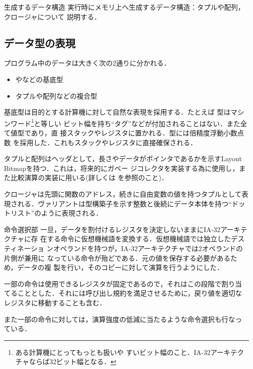 \documentclass[a4paper,titlepage,report,disablejfam]{jsbook}
\begin{document}
\begin{resbonsiblesection}{生成するデータ構造}{\kobori}\label{sc:impl-data-structure}%
 実行時にメモリ上へ生成するデータ構造：タプルや配列，クロージャについて
 説明する．

\subsection{データ型の表現}
プログラム中のデータは大きく次の2通りに分かれる．
\begin{itemize}
 \item {}やなどの基底型
 \item タプルや配列などの複合型
\end{itemize}

基底型は目的とする計算機に対して自然な表現を採用する．たとえば
型はマシンワード\footnote{ある計算機にとってもっとも扱いや
すいビット幅のこと．IA-32アーキテクチャならば32ビット幅となる．}と等しい
ビット幅を持ち``タグ''などが付加されることはない．また全て値型であり，直
接スタックやレジスタに置かれる．型には倍精度浮動小数点数
を採用した．これもスタックやレジスタに直接確保される．

タプルと配列はヘッダとして，長さやデータがポインタであるかを示すLayout
Bitmap\cite{Nguyen:2006:CMP:1140335.1140364}を持つ．これは，将来的にガベー
ジコレクタを実装する為に使用し，また比較演算の実装に用いる(詳しくは
を参照のこと)．

クロージャは先頭に関数のアドレス，続きに自由変数の値を持つタプルとして表
現される．ヴァリアントは型構築子を示す整数と後続にデータ本体を持つ``ドッ
トリスト''のように表現される．
\end{resbonsiblesection}

\begin{resbonsiblesection}{命令選択部}{\kobori}\label{sc:impl-inst}
 一旦，データを割付けるレジスタを決定しないままにIA-32アーキテクチャに存
 在する命令に仮想機械語を変換する．仮想機械語では独立したデスティネーショ
 ンオペランドを持つが，IA-32アーキテクチャでは2オペランドの片側が兼用に
 なっている命令が殆どである．元の値を保存する必要があるため，データの複
 製を行い，そのコピーに対して演算を行うようにした．

 一部の命令は使用できるレジスタが固定であるので，それはこの段階で割り当
 てることとした．それには呼び出し規約を満足させるために，戻り値を適切な
 レジスタに移動することも含む．

 また一部の命令に対しては，演算強度の低減に当たるような命令選択も行なっ
 ている．
\end{resbonsiblesection}
\end{document}
